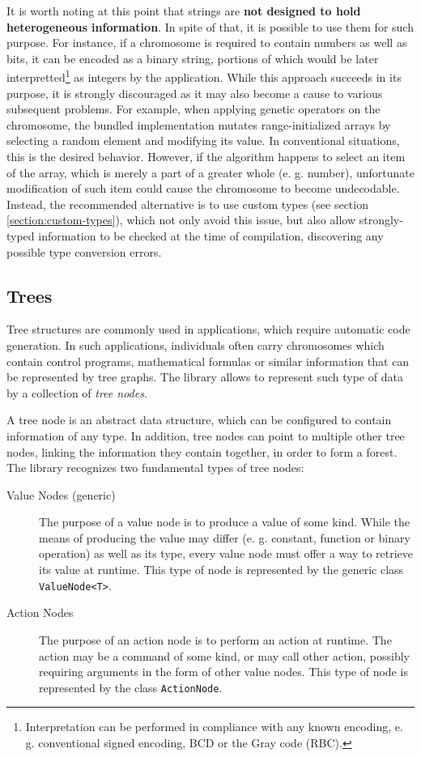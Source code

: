 It is worth noting at this point that strings are \textbf{not designed to hold heterogeneous information}. In spite of that, it is possible to use them for such purpose. For instance, if a chromosome is required to contain numbers as well as bits, it can be encoded as a binary string, portions of which would be later interpretted\footnote{Interpretation can be performed in compliance with any known encoding, e. g. conventional signed encoding, BCD or the Gray code (RBC).} as integers by the application. While this approach succeeds in its purpose, it is strongly discouraged as it may also become a cause to various subsequent problems. For example, when applying genetic operators on the chromosome, the bundled implementation mutates range-initialized arrays by selecting a random element and modifying its value. In conventional situations, this is the desired behavior. However, if the algorithm happens to select an item of the array, which is merely a part of a greater whole (e. g. number), unfortunate modification of such item could cause the chromosome to become undecodable. Instead, the recommended alternative is to use custom types (see section \ref{section:custom-types}), which not only avoid this issue, but also allow strongly-typed information to be checked at the time of compilation, discovering any possible type conversion errors.

\subsection{Trees}
Tree structures are commonly used in applications, which require automatic code generation. In such applications, individuals often carry chromosomes which contain control programs, mathematical formulas or similar information that can be represented by tree graphs. The library allows to represent such type of data by a collection of \textit{tree nodes}.

A tree node is an abstract data structure, which can be configured to contain information of any type. In addition, tree nodes can point to multiple other tree nodes, linking the information they contain together, in order to form a forest. The library recognizes two fundamental types of tree nodes:
~
\begin{description}
	\item[Value Nodes (generic)]
	The purpose of a value node is to produce a value of some kind. While the means of producing the value may differ (e. g. constant, function or binary operation) as well as its type, every value node must offer a way to retrieve its value at runtime. This type of node is represented by the generic class \texttt{ValueNode<T>}.

	\item[Action Nodes]
	The purpose of an action node is to perform an action at runtime. The action may be a command of some kind, or may call other action, possibly requiring arguments in the form of other value nodes. This type of node is represented by the class \texttt{ActionNode}.
\end{description}

